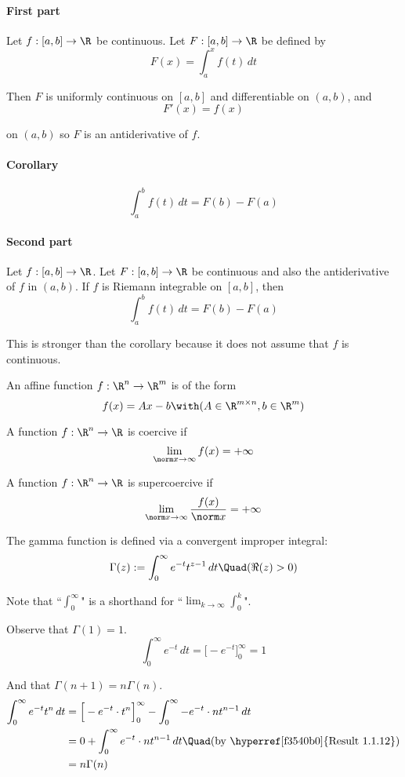 \label{b869dc0}

\paragraph{First part} Let $f:[a,b]\to\R$ be continuous. Let
$F:[a,b]\to\R$ be defined by
$$F(x)=\int_a^xf(t)\,dt$$

Then $F$ is uniformly continuous on $[a,b]$ and differentiable on
$(a,b)$, and
$$F'(x)=f(x)$$

on $(a,b)$ so $F$ is an antiderivative of $f$.

\paragraph{Corollary}
$$\int_a^bf(t)\,dt=F(b)-F(a)$$

\paragraph{Second part} Let $f:[a,b]\to\R$. Let $F:[a,b]\to\R$ be
continuous and also the antiderivative of $f$ in $(a,b)$. If $f$ is
Riemann integrable on $[a,b]$, then
$$\int_a^bf(t)\,dt=F(b)-F(a)$$

This is stronger than the corollary because it does not assume that
$f$ is continuous.

\label{dcb7f73}

An affine function $f:\R^n\to\R^m$ is of the form
$$
	f(x)=Ax-b\with(A\in\R^{m\times n},b\in\R^m)
$$


A function $f:\R^n\to\R$ is coercive if
$$
  \lim_{\norm x\to\infty}f(x)=+\infty
$$


A function $f:\R^n\to\R$ is supercoercive if
$$
  \lim_{\norm x\to\infty}\frac{f(x)}{\norm x}=+\infty
$$

\label{ce1fa3f}

The gamma function is defined via a convergent improper integral:
$$
	\Gamma(z):=\int_0^\infty e^{-t}t^{z-1}\,dt\Quad(\Re(z)>0)
$$

Note that ``$\displaystyle\int_0^\infty$" is a shorthand for
``$\displaystyle\lim_{k\to\infty}\int_0^k$".

Observe that $\Gamma(1)=1$.
$$\int_0^\infty e^{-t}\,dt=\Big[-e^{-t}\Big]_0^\infty=1$$

And that $\Gamma(n+1)=n\Gamma(n)$.
\begin{align*}
	\int_0^\infty e^{-t}t^n\,dt
	 & = \Big[-e^{-t}\cdot t^n\Big]_0^\infty-\int_0^\infty-e^{-t}\cdot nt^{n-1}\,dt                  \\
	 & = 0+\int_0^\infty e^{-t}\cdot nt^{n-1}\,dt \Quad\text{(by \hyperref[f3540b0]{Result 1.1.12})} \\
	 & = n\Gamma(n)
\end{align*}
